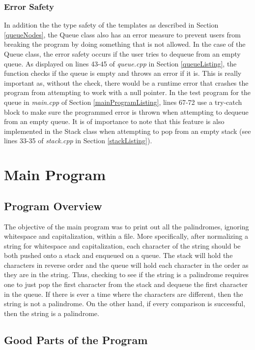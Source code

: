 \documentclass[letterpaper, 10pt,DIV=13]{scrartcl}
\numberwithin{equation}{section} %
\numberwithin{figure}{section} %
\numberwithin{table}{section} %
\begin{document}
\subsubsection{Error Safety}
In addition the the type safety of the templates as described in Section \ref{queueNodes}, the Queue class also has an error measure to prevent users from breaking
the program by doing something that is not allowed. In the case of the Queue class, the error safety occurs if the user tries to dequeue from an empty queue. As displayed on lines 43-45 of \textit{queue.cpp} in Section \ref{queueListing}, the function checks if the queue is empty and throws an error if it is. This is really important as, without the check, there would be a runtime error that crashes the program from attempting to work with a null pointer. In the test program for the queue in \textit{main.cpp} of Section \ref{mainProgramListing}, lines 67-72 use a try-catch block to make sure the programmed error is thrown when attempting to dequeue from an empty queue. It is of importance to note that this feature is also implemented in the Stack class when attempting to pop from an empty stack (see lines 33-35 of \textit{stack.cpp} in Section \ref{stackListing}).

\section{Main Program}
\subsection{Program Overview}
The objective of the main program was to print out all the palindromes, ignoring whitespace and capitalization, within a file. More specifically, after normalizing
a string for whitespace and capitalization, each character of the string should be both pushed onto a stack and enqueued on a queue. The stack will hold the
characters in reverse order and the queue will hold each character in the order as they are in the string. Thus, checking to see if the string is a palindrome requires
one to just pop the first character from the stack and dequeue the first character in the queue. If there is ever a time where the characters are different, then
the string is not a palindrome. On the other hand, if every comparison is successful, then the string is a palindrome.


\subsection{Good Parts of the Program}
\end{document}
